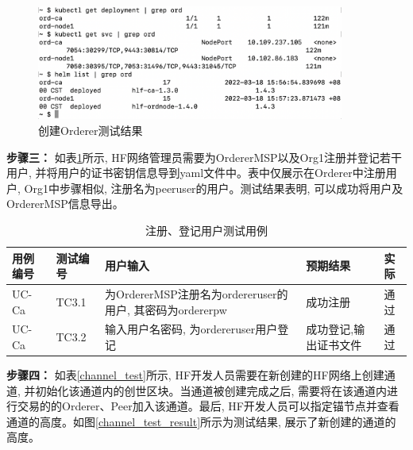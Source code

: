 \begin{figure}[h] %
    \centering %
    \includegraphics[width=0.9\textwidth]{FIGs/chapter5/orderer.png} %
    \caption{创建Orderer测试结果} %
    \label{testcase2result} %
\end{figure}%

\textbf{步骤三：} 如表\ref{reg_enroll_test}所示, HF网络管理员需要为OrdererMSP以及Org1注册并登记若干用户, 并将用户的证书密钥信息导到yaml文件中。表中仅展示在Orderer中注册用户, Org1中步骤相似, 注册名为peeruser的用户。测试结果表明, 可以成功将用户及OrdererMSP信息导出。

{\footnotesize
\begin{longtable}[h]{m{45pt} m{45pt} m{180pt} m{50pt} m{20pt}}
    \caption[注册、登记用户测试用例]{注册、登记用户测试用例} \label{reg_enroll_test}\\
        \hline  
        用例编号&测试编号&用户输入&预期结果&实际\\
        \hline
        UC-Ca & TC3.1 & 为OrdererMSP注册名为ordereruser的用户, 其密码为ordererpw & 成功注册 & 通过 \\
        \hline
        UC-Ca & TC3.2 & 输入用户名密码, 为ordereruser用户登记 & 成功登记,输出证书文件 & 通过 \\
        \hline
    \end{longtable} 
}

\textbf{步骤四：} 如表\ref{channel_test}所示, HF开发人员需要在新创建的HF网络上创建通道, 并初始化该通道内的创世区块。当通道被创建完成之后, 需要将在该通道内进行交易的的Orderer、Peer加入该通道。最后, HF开发人员可以指定锚节点并查看通道的高度。如图\ref{channel_test_result}所示为测试结果, 展示了新创建的通道的高度。

